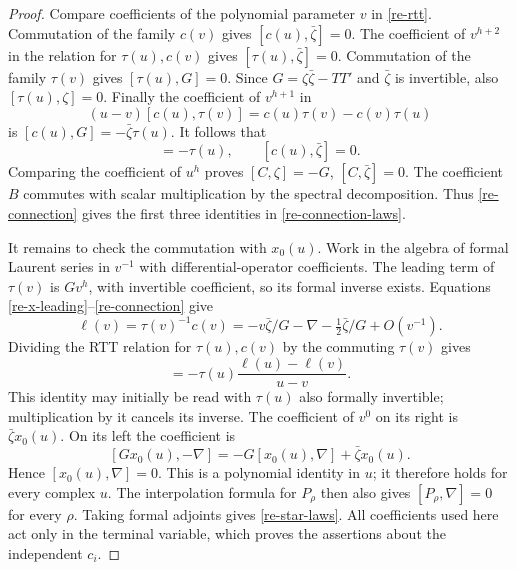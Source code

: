 \begin{proof}
Compare coefficients of the polynomial parameter \(v\) in
\eqref{re-rtt}.  Commutation of the family \(c(v)\) gives
\([c(u),\bar\zeta]=0\).
The coefficient of \(v^{h+2}\) in the relation for
\(\tau(u),c(v)\) gives \([\tau(u),\bar\zeta]=0\).
Commutation of the family \(\tau(v)\) gives
\([\tau(u),G]=0\).  Since \(G=\zeta\bar\zeta-TT'\) and
\(\bar\zeta\) is invertible, also \([\tau(u),\zeta]=0\).
Finally the coefficient of \(v^{h+1}\) in
\[
 (u-v)[c(u),\tau(v)]
                    =c(u)\tau(v)-c(v)\tau(u)
\]
is
\([c(u),G]=-\bar\zeta\tau(u)\).
It follows that
\begin{equation}
 [c(u),\zeta]=-\tau(u),\qquad [c(u),\bar\zeta]=0.
                                                               \label{re-zeta-comm}
\end{equation}
Comparing the coefficient of \(u^h\) proves
\([C,\zeta]=-G\), \([C,\bar\zeta]=0\).  The coefficient \(B\)
commutes with scalar multiplication by the spectral
decomposition.  Thus \eqref{re-connection} gives the first
three identities in \eqref{re-connection-laws}.

It remains to check the commutation with \(x_0(u)\).
Work in the algebra of formal Laurent series in \(v^{-1}\)
with differential-operator coefficients.  The leading term
of \(\tau(v)\) is \(Gv^h\), with invertible coefficient, so
its formal inverse exists.  Equations
\eqref{re-x-leading}--\eqref{re-connection} give
\begin{equation}
 \ell(v)=\tau(v)^{-1}c(v)
      =-v\bar\zeta/G-\nabla-\tfrac12\bar\zeta/G+O(v^{-1}).
                                                               \label{re-laurent}
\end{equation}
Dividing the RTT relation for \(\tau(u),c(v)\) by the
commuting \(\tau(v)\) gives
\begin{equation}
 [\tau(u),\ell(v)]
       =-\tau(u)\frac{\ell(u)-\ell(v)}{u-v}.       \label{re-tau-ell}
\end{equation}
This identity may initially be read with \(\tau(u)\) also
formally invertible; multiplication by it cancels its inverse.
The coefficient of \(v^0\) on its right is
\(\bar\zeta x_0(u)\).  On its left the coefficient is
\[
 [Gx_0(u),-\nabla]
        =-G[x_0(u),\nabla]+\bar\zeta x_0(u).
 \]
Hence \([x_0(u),\nabla]=0\).  This is a polynomial
identity in \(u\); it therefore holds for every complex \(u\).
The interpolation formula for \(P_\rho\) then also gives
\([P_\rho,\nabla]=0\) for every \(\rho\).
Taking formal adjoints gives \eqref{re-star-laws}.
All coefficients used here act only in the terminal variable,
which proves the assertions about the independent \(c_i\).


\end{proof}
